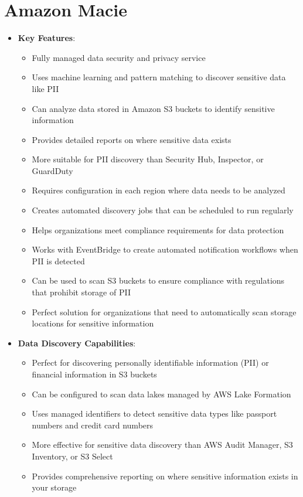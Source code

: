 \documentclass[11pt,a4paper]{report}
\begin{document}
\section{Amazon Macie}

\begin{itemize}
  \item \textbf{Key Features}:
\begin{itemize}
  \item Fully managed data security and privacy service
  \item Uses machine learning and pattern matching to discover sensitive data like PII
  \item Can analyze data stored in Amazon S3 buckets to identify sensitive information
  \item Provides detailed reports on where sensitive data exists
  \item More suitable for PII discovery than Security Hub, Inspector, or GuardDuty
  \item Requires configuration in each region where data needs to be analyzed
  \item Creates automated discovery jobs that can be scheduled to run regularly
  \item Helps organizations meet compliance requirements for data protection
  \item Works with EventBridge to create automated notification workflows when PII is detected
  \item Can be used to scan S3 buckets to ensure compliance with regulations that prohibit storage of PII
  \item Perfect solution for organizations that need to automatically scan storage locations for sensitive information
\end{itemize}
  \item \textbf{Data Discovery Capabilities}:
\begin{itemize}
  \item Perfect for discovering personally identifiable information (PII) or financial information in S3 buckets
  \item Can be configured to scan data lakes managed by AWS Lake Formation
  \item Uses managed identifiers to detect sensitive data types like passport numbers and credit card numbers
  \item More effective for sensitive data discovery than AWS Audit Manager, S3 Inventory, or S3 Select
  \item Provides comprehensive reporting on where sensitive information exists in your storage

\end{itemize}
\end{itemize}
\end{document}
